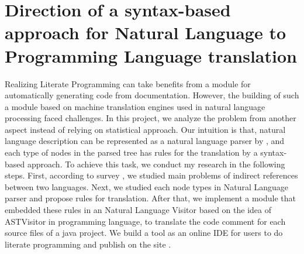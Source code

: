 \section{Direction of  a syntax-based approach for Natural Language to Programming Language translation}
Realizing Literate Programming can take benefits from a module for automatically generating code from documentation. However, the building of such a module based on machine translation engines used in natural language processing faced challenges. In this project, we analyze the problem from another aspect instead of relying on statistical approach. Our intuition is that, natural language description can be represented as a natural language parser by \cite{}, and each type of nodes in the parsed tree has rules for the translation by a syntax-based approach. To achieve this task, we conduct my research in the following steps.  First, according to survey \cite{}, we studied main problems of indirect references between two languages. Next, we studied each node types in Natural Language parser and propose rules for translation. After that, we implement a module that embedded these rules in an Natural Language Visitor based on the idea of ASTVisitor in programming language, to translate the code comment for each source files of a java project. We build a tool as an online IDE for users to do literate programming and publish on the site \cite{}. 









